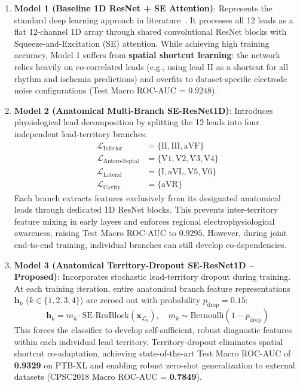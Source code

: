\documentclass[12pt]{elsarticle}
\begin{document}
\begin{enumerate}
    \item \textbf{Model 1 (Baseline 1D ResNet + SE Attention)}: Represents the standard deep learning approach in literature~\cite{strodthoff2020deep}. It processes all 12 leads as a flat 12-channel 1D array through shared convolutional ResNet blocks with Squeeze-and-Excitation (SE) attention. While achieving high training accuracy, Model 1 suffers from \textbf{spatial shortcut learning}: the network relies heavily on co-correlated leads (e.g., using lead II as a shortcut for all rhythm and ischemia predictions) and overfits to dataset-specific electrode noise configurations (Test Macro ROC-AUC = $0.9248$).
    
    \item \textbf{Model 2 (Anatomical Multi-Branch SE-ResNet1D)}: Introduces physiological lead decomposition by splitting the 12 leads into four independent lead-territory branches:
    \begin{align}
    \mathcal{L}_{\text{Inferior}} &= \{\text{II}, \text{III}, \text{aVF}\} \\
    \mathcal{L}_{\text{Antero-Septal}} &= \{\text{V1}, \text{V2}, \text{V3}, \text{V4}\} \\
    \mathcal{L}_{\text{Lateral}} &= \{\text{I}, \text{aVL}, \text{V5}, \text{V6}\} \\
    \mathcal{L}_{\text{Cavity}} &= \{\text{aVR}\}
    \end{align}
    Each branch extracts features exclusively from its designated anatomical leads through dedicated 1D ResNet blocks. This prevents inter-territory feature mixing in early layers and enforces regional electrophysiological awareness, raising Test Macro ROC-AUC to $0.9295$. However, during joint end-to-end training, individual branches can still develop co-dependencies.
    
    \item \textbf{Model 3 (Anatomical Territory-Dropout SE-ResNet1D -- Proposed)}: Incorporates stochastic lead-territory dropout during training. At each training iteration, entire anatomical branch feature representations $\mathbf{h}_k$ ($k \in \{1, 2, 3, 4\}$) are zeroed out with probability $p_{\text{drop}} = 0.15$:
    \begin{equation}
    \mathbf{h}_k = m_k \cdot \text{SE-ResBlock}(\mathbf{x}_{\mathcal{L}_k}), \quad m_k \sim \text{Bernoulli}(1 - p_{\text{drop}})
    \end{equation}
    This forces the classifier to develop self-sufficient, robust diagnostic features within each individual lead territory. Territory-dropout eliminates spatial shortcut co-adaptation, achieving state-of-the-art Test Macro ROC-AUC of \textbf{0.9329} on PTB-XL and enabling robust zero-shot generalization to external datasets (CPSC2018 Macro ROC-AUC = \textbf{0.7849}).
\end{enumerate}
\end{document}
